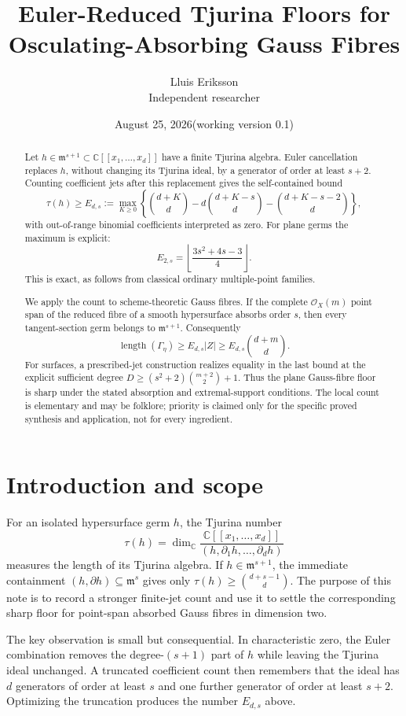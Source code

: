 \documentclass[11pt,a4paper]{article}
\title{Euler-Reduced Tjurina Floors for\\
Osculating-Absorbing Gauss Fibres}
\author{Lluis Eriksson\\\small Independent researcher}
\date{August 25, 2026\quad (working version 0.1)}
\theoremstyle{definition}
\numberwithin{equation}{section}
\newcommand{\kk}{\mathbb C}
\newcommand{\cO}{\mathcal O}
\newcommand{\m}{\mathfrak m}
\newcommand{\length}{\operatorname{length}}
\begin{document}
\maketitle

\begin{abstract}
Let \(h\in\m^{s+1}\subset\kk[[x_1,\ldots,x_d]]\) have a finite
Tjurina algebra.  Euler cancellation replaces \(h\), without changing its
Tjurina ideal, by a generator of order at least \(s+2\).  Counting coefficient
jets after this replacement gives the self-contained bound
\[
 \tau(h)\ge E_{d,s}:=\max_{K\ge0}
 \left\{
 \binom{d+K}{d}
 -d\binom{d+K-s}{d}
 -\binom{d+K-s-2}{d}
 \right\},
\]
with out-of-range binomial coefficients interpreted as zero.  For plane
germs the maximum is explicit:
\[
 E_{2,s}=\left\lfloor\frac{3s^2+4s-3}{4}\right\rfloor.
\]
This is exact, as follows from classical ordinary multiple-point families.

We apply the count to scheme-theoretic Gauss fibres.  If the complete
\(\cO_X(m)\) point span of the reduced fibre of a smooth hypersurface
absorbs order \(s\), then every tangent-section germ belongs to
\(\m^{s+1}\).  Consequently
\[
 \length(\Gamma_\eta)\ge
 E_{d,s}|Z|\ge E_{d,s}\binom{d+m}{d}.
\]
For surfaces, a prescribed-jet construction realizes equality in the last
bound at the explicit sufficient degree
\(D\ge(s^2+2)\binom{m+2}{2}+1\).  Thus the plane Gauss-fibre floor is sharp
under the stated absorption and extremal-support conditions.  The local
count is elementary and may be folklore; priority is claimed only for the
specific proved synthesis and application, not for every ingredient.
\end{abstract}

\section{Introduction and scope}

For an isolated hypersurface germ \(h\), the Tjurina number
\[
 \tau(h)=\dim_\kk
 \frac{\kk[[x_1,\ldots,x_d]]}
 {(h,\partial_1h,\ldots,\partial_dh)}
\]
measures the length of its Tjurina algebra.  If
\(h\in\m^{s+1}\), the immediate containment
\((h,\partial h)\subseteq\m^s\) gives only
\(\tau(h)\ge\binom{d+s-1}{d}\).  The purpose of this note is to record a
stronger finite-jet count and use it to settle the corresponding sharp
floor for point-span absorbed Gauss fibres in dimension two.

The key observation is small but consequential.  In characteristic zero,
the Euler combination removes the degree-\((s+1)\) part of \(h\) while leaving
the Tjurina ideal unchanged.  A truncated coefficient count then remembers
that the ideal has \(d\) generators of order at least \(s\) and one further
generator of order at least \(s+2\).  Optimizing the truncation produces
the number \(E_{d,s}\) above.
\end{document}
